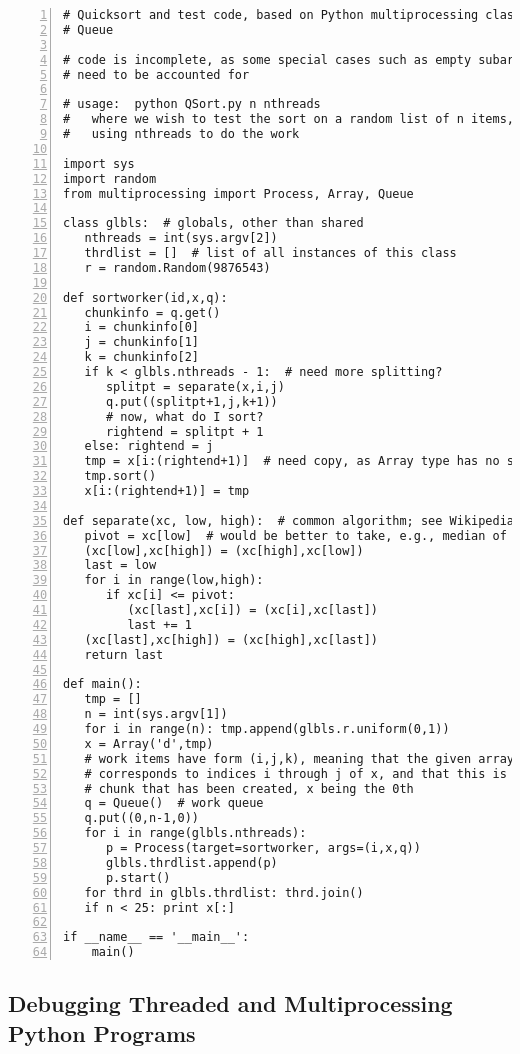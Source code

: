 \begin{Verbatim}[fontsize=\relsize{-2},numbers=left]
# Quicksort and test code, based on Python multiprocessing class and
# Queue

# code is incomplete, as some special cases such as empty subarrays
# need to be accounted for

# usage:  python QSort.py n nthreads 
#   where we wish to test the sort on a random list of n items, 
#   using nthreads to do the work

import sys
import random
from multiprocessing import Process, Array, Queue

class glbls:  # globals, other than shared
   nthreads = int(sys.argv[2])
   thrdlist = []  # list of all instances of this class
   r = random.Random(9876543)

def sortworker(id,x,q):
   chunkinfo = q.get()
   i = chunkinfo[0]
   j = chunkinfo[1]
   k = chunkinfo[2]
   if k < glbls.nthreads - 1:  # need more splitting?
      splitpt = separate(x,i,j)
      q.put((splitpt+1,j,k+1))
      # now, what do I sort?
      rightend = splitpt + 1
   else: rightend = j
   tmp = x[i:(rightend+1)]  # need copy, as Array type has no sort() method
   tmp.sort()
   x[i:(rightend+1)] = tmp

def separate(xc, low, high):  # common algorithm; see Wikipedia
   pivot = xc[low]  # would be better to take, e.g., median of 1st 3 elts
   (xc[low],xc[high]) = (xc[high],xc[low])
   last = low
   for i in range(low,high):
      if xc[i] <= pivot:
         (xc[last],xc[i]) = (xc[i],xc[last])
         last += 1
   (xc[last],xc[high]) = (xc[high],xc[last])
   return last

def main():
   tmp = []
   n = int(sys.argv[1])
   for i in range(n): tmp.append(glbls.r.uniform(0,1))
   x = Array('d',tmp)  
   # work items have form (i,j,k), meaning that the given array chunk
   # corresponds to indices i through j of x, and that this is the kth
   # chunk that has been created, x being the 0th
   q = Queue()  # work queue
   q.put((0,n-1,0))  
   for i in range(glbls.nthreads):
      p = Process(target=sortworker, args=(i,x,q))
      glbls.thrdlist.append(p)
      p.start()
   for thrd in glbls.thrdlist: thrd.join()
   if n < 25: print x[:]

if __name__ == '__main__':
    main()
\end{Verbatim}

\subsection{Debugging Threaded and Multiprocessing Python Programs}

